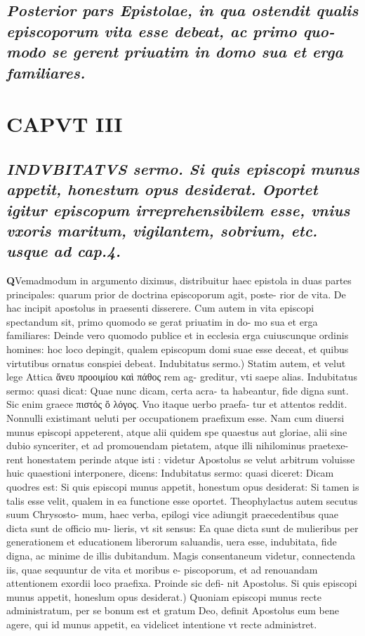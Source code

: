 \documentclass{article}
\begin{document}
\begin{pages}
\subsection*{\textit{Posterior pars Epistolae, in qua ostendit qualis episcoporum vita esse debeat, ac primo quo- modo se gerent priuatim in domo sua et erga familiares. }}
\endnumbering\beginnumbering\section{CAPVT III}
{}
\subsection*{\textit{\huge\textbf{I}\normalsize NDVBITATVS sermo. Si quis episcopi munus appetit, honestum opus desiderat. Oportet igitur episcopum irreprehensibilem esse, vnius vxoris maritum, vigilantem, sobrium, etc. usque ad cap.4. }}\pstart \huge\textbf{Q}\normalsize Vemadmodum in argumento diximus, distribuitur haec epistola in duas partes principales: quarum prior de doctrina episcoporum agit, poste- rior de vita. De hac incipit apostolus in praesenti disserere. Cum autem in vita episcopi spectandum sit, primo quomodo se gerat priuatim in do- mo sua et erga familiares: Deinde vero quomodo publice et in ecclesia erga cuiuscunque  ordinis homines: hoc loco depingit, qualem episcopum domi suae esse deceat, et quibus virtutibus ornatus conspiei debeat.  \pend\pstart Indubitatus sermo.) Statim autem, et velut lege Attica ἄνευ προοιμίου καὶ πάθος rem ag- greditur, vti saepe alias. Indubitatus sermo: quasi dicat: Quae nunc dicam, certa acra- ta habeantur, fide digna sunt. Sic enim graece πιστός ὅ λόγος. Vno itaque  uerbo praefa- tur et attentos reddit. Nonnulli existimant ueluti per occupationem praefixum esse. Nam cum diuersi munus episcopi appeterent, atque  alii quidem spe quaestus aut gloriae, alii sine dubio synceriter, et ad promouendam pietatem, atque  illi nihilominus praetexe- rent honestatem perinde atque  isti : videtur Apostolus se velut arbitrum voluisse huic quaestioni interponere, dicens: Indubitatus sermo: quasi diceret: Dicam quodres est: Si quis episcopi munus appetit, honestum opus desiderat: Si tamen is talis esse velit, qualem in ea functione esse oportet. Theophylactus autem secutus suum Chrysosto- mum, haec verba, epilogi vice adiungit praecedentibus quae dicta sunt de officio mu- lieris, vt sit sensus: Ea quae dicta sunt de mulieribus per generationem et educationem liberorum saluandis, uera esse, indubitata, fide digna, ac minime de illis dubitandum. Magis consentaneum videtur, connectenda iis, quae sequuntur de vita et moribus e- piscoporum, et ad renouandam attentionem exordii loco praefixa. Proinde sic defi- nit Apostolus.  \pend\pstart Si quis episcopi munus appetit, honeslum opus desiderat.) Quoniam episcopi munus recte administratum, per se bonum est et gratum Deo, definit Apostolus eum bene agere, qui id munus appetit, ea videlicet intentione vt recte administret. 
\end{pages}
\end{document}
